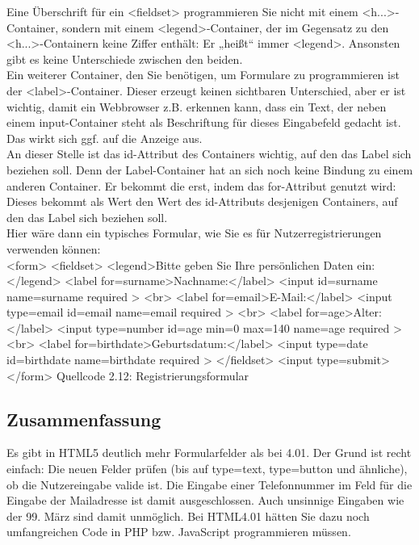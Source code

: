 Eine Überschrift für ein <fieldset> programmieren Sie nicht mit einem <h...>-Container, sondern mit einem <legend>-Container, der im Gegensatz zu den <h...>-Containern keine Ziffer enthält: Er „heißt“ immer <legend>. Ansonsten gibt es keine Unterschiede zwischen den beiden.\\

Ein weiterer Container, den Sie benötigen, um Formulare zu programmieren ist der <label>-Container. Dieser erzeugt keinen sichtbaren Unterschied, aber er ist wichtig, damit ein Webbrowser z.B. erkennen kann, dass ein Text, der neben einem input-Container steht als Beschriftung für dieses Eingabefeld gedacht ist. Das wirkt sich ggf. auf die Anzeige aus.\\

An dieser Stelle ist das id-Attribut des Containers wichtig, auf den das Label sich beziehen soll. Denn der Label-Container hat an sich noch keine Bindung zu einem anderen Container. Er bekommt die erst, indem das for-Attribut genutzt wird: Dieses bekommt als Wert den Wert des id-Attributs desjenigen Containers, auf den das Label sich beziehen soll.\\

Hier wäre dann ein typisches Formular, wie Sie es für Nutzerregistrierungen verwenden können:\\

<form>
<fieldset>
<legend>Bitte geben Sie Ihre persönlichen Daten ein:</legend>
<label for=surname>Nachname:</label>
<input id=surname name=surname required >
<br>
<label for=email>E-Mail:</label>
<input type=email id=email name=email required >
<br>
<label for=age>Alter:</label>
<input type=number id=age min=0 max=140 name=age required >
<br>
<label for=birthdate>Geburtsdatum:</label>
<input type=date id=birthdate name=birthdate required >
</fieldset>
<input type=submit>
</form>          
Quellcode 2.12: Registrierungsformular

\subsection{Zusammenfassung}

Es gibt in HTML5 deutlich mehr Formularfelder als bei 4.01. Der Grund ist recht einfach: Die neuen Felder prüfen (bis auf type=text, type=button und ähnliche), ob die Nutzereingabe valide ist. Die Eingabe einer Telefonnummer im Feld für die Eingabe der Mailadresse ist damit ausgeschlossen. Auch unsinnige Eingaben wie der 99. März sind damit unmöglich. Bei HTML4.01 hätten Sie dazu noch umfangreichen Code in PHP bzw. JavaScript programmieren müssen.

